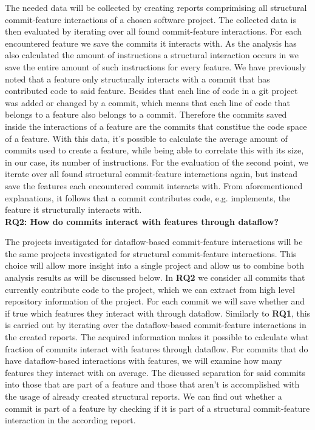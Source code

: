 The needed data will be collected by creating reports comprimising all structural commit-feature interactions of a chosen software project.
The collected data is then evaluated by iterating over all found commit-feature interactions.
For each encountered feature we save the commits it interacts with.
As the analysis has also calculated the amount of instructions a structural interaction occurs in 
we save the entire amount of such instructions for every feature.
We have previously noted that a feature only structurally interacts with a commit that has contributed code to said feature.
Besides that each line of code in a git project was added or changed by a commit, 
which means that each line of code that belongs to a feature also belongs to a commit.
Therefore the commits saved inside the interactions of a feature are the commits that constitue the code space of a feature. 
With this data, it's possible to calculate the average amount of commits used to create a feature, 
while being able to correlate this with its size, in our case, its number of instructions.
For the evaluation of the second point, we iterate over all found structural commit-feature interactions again, 
but instead save the features each encountered commit interacts with. 
From aforementioned explanations, it follows that a commit contributes code, e.g. implements, the feature it structurally interacts with. \\ 

\textbf{RQ2: How do commits interact with features through dataflow?}

The projects investigated for dataflow-based commit-feature interactions will be the same projects investigated for structural commit-feature interactions.
This choice will allow more insight into a single project and allow us to combine both analysis results as will be discussed below.
In \textbf{RQ2} we consider all commits that currently contribute code to the project, 
which we can extract from high level repository information of the project.
For each commit we will save whether and if true which features they interact with through dataflow.
Similarly to \textbf{RQ1}, this is carried out by iterating over the dataflow-based commit-feature interactions in the created reports.
The acquired information makes it possible to calculate what fraction of commits interact with features through dataflow.
For commits that do have dataflow-based interactions with features, we will examine how many features they interact with on average.
The dicussed separation for said commits into those that are part of a feature and those that aren't 
is accomplished with the usage of already created structural reports. 
We can find out whether a commit is part of a feature by checking if it is part of a structural commit-feature interaction in the according report. \\

